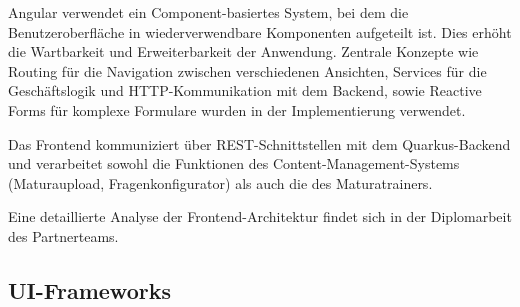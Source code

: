Angular verwendet ein Component-basiertes System, bei dem die Benutzeroberfläche in wiederverwendbare Komponenten 
aufgeteilt ist. Dies erhöht die Wartbarkeit und Erweiterbarkeit der Anwendung. Zentrale Konzepte wie Routing für 
die Navigation zwischen verschiedenen Ansichten, Services für die Geschäftslogik und HTTP-Kommunikation mit dem Backend, 
sowie Reactive Forms für komplexe Formulare wurden in der Implementierung verwendet.

Das Frontend kommuniziert über REST-Schnittstellen mit dem Quarkus-Backend und verarbeitet sowohl die Funktionen 
des Content-Management-Systems (Maturaupload, Fragenkonfigurator) als auch die des Maturatrainers.

Eine detaillierte Analyse der Frontend-Architektur findet sich in der Diplomarbeit des Partnerteams.

\subsection{UI-Frameworks}
 